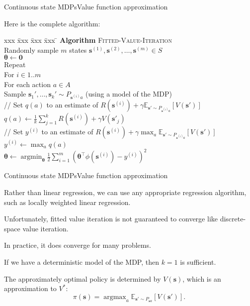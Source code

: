 \documentclass{beamer}
\renewcommand{\vec}[1]{\boldsymbol{#1}}
\def\Expec{\mathbb{E}}
\DeclareMathOperator*{\argmax}{argmax}
\DeclareMathOperator*{\argmin}{argmin}
\begin{document}
\begin{frame}{Continuous state MDPs}{Value function approximation}

  Here is the complete algorithm:
  \begin{tabbing}
    xxx \= xxx \= xxx \= xxx \= \kill
    \textbf{Algorithm} \textsc{Fitted-Value-Iteration} \\
    \> Randomly sample $m$ states $\vec{s}^{(1)},\vec{s}^{(2)},\ldots,\vec{s}^{(m)} \in S$ \\
    \> $\vec{\theta} \leftarrow \vec{0}$ \\
    \> Repeat \\
    \> \> For $i \in 1..m$ \\
    \> \> \> For each action $a \in A$ \\
    \> \> \> \> Sample $\vec{s}_1', \ldots, \vec{s}_k' \sim
    P_{\vec{s}^{(i)}a}$ (using a model of the MDP) \\
    \> \> \> \> // Set $q(a)$ to an estimate of $R(\vec{s}^{(i)})+\gamma \Expec_{\vec{s}'\sim P_{\vec{s}^{(i)}a}}[V(\vec{s}')]$ \\
    \> \> \> \> $q(a) \leftarrow \frac{1}{k}\sum_{j=1}^k R(\vec{s}^{(i)}) + \gamma V(\vec{s}'_j)$ \\
    \> \> \> // Set $y^{(i)}$ to an estimate of $R(\vec{s}^{(i)})+\gamma \max_a \Expec_{\vec{s}'\sim P_{\vec{s}^{(i)}a}}[V(\vec{s}')]$ \\    \> \> \> $y^{(i)} \leftarrow \max_a q(a)$ \\
    \> \> $\vec{\theta} \leftarrow \argmin_{\vec{\theta}} \frac{1}{2}\sum_{i=1}^m \left( \vec{\theta}^\top \phi(\vec{s}^{(i)}) - y^{(i)}\right)^2$ \\
  \end{tabbing}
  
\end{frame}


\begin{frame}{Continuous state MDPs}{Value function approximation}

  Rather than linear regression, we can use any appropriate regression
  algorithm, such as locally weighted linear regression.

  \medskip
  
  Unfortunately, fitted value iteration is \alert{not guaranteed to converge}
  like discrete-space value iteration.

  \medskip

  In practice, it does converge for many problems.

  \medskip

  If we have a deterministic model of the MDP, then $k=1$ is sufficient.

  \medskip

  The \alert{approximately optimal policy} is determined by
  $V(\vec{s})$, which is an approximation to $V^*$:
  \[ \pi(\vec{s}) = \argmax_a \Expec_{\vec{s}'\sim P_{\vec{s}a}}[V(\vec{s}')] . \]
  
\end{frame}
\end{document}
